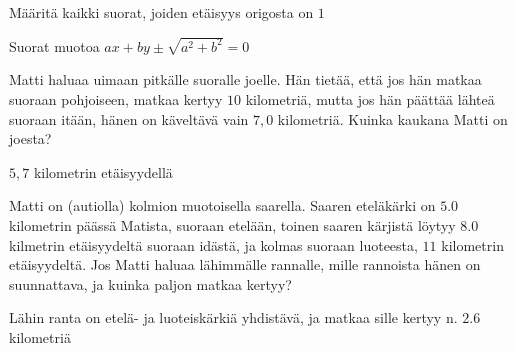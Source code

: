 \begin{tehtavasivu}
\begin{tehtava}
\begin{alakohdat}
\end{alakohdat}
\begin{vastaus}
\begin{alakohdat}
\end{alakohdat}
\end{vastaus}
\end{tehtava}

\begin{tehtava}
Määritä kaikki suorat, joiden etäisyys origosta on $1$
\begin{vastaus}
Suorat muotoa $ax+by \pm \sqrt{a^2+b^2} = 0$
\end{vastaus}
\end{tehtava}

\begin{tehtava}
Matti haluaa uimaan pitkälle suoralle joelle. Hän tietää, että jos hän matkaa suoraan pohjoiseen, matkaa kertyy $10$ kilometriä, mutta jos hän päättää lähteä suoraan itään, hänen on käveltävä vain $7,0$ kilometriä. Kuinka kaukana Matti on joesta?
\begin{vastaus}
$5,7$ kilometrin etäisyydellä
\end{vastaus}
\end{tehtava}

\begin{tehtava}
Matti on (autiolla) kolmion muotoisella saarella. Saaren eteläkärki on $5.0$ kilometrin päässä Matista, suoraan etelään, toinen saaren kärjistä löytyy $8.0$ kilmetrin etäisyydeltä suoraan idästä, ja kolmas suoraan luoteesta, $11$ kilometrin etäisyydeltä. Jos Matti haluaa lähimmälle rannalle, mille rannoista hänen on suunnattava, ja kuinka paljon matkaa kertyy?
\begin{vastaus}
Lähin ranta on etelä- ja luoteiskärkiä yhdistävä, ja matkaa sille kertyy n. $2.6$ kilometriä
\end{vastaus}
\end{tehtava}


\end{tehtavasivu}
